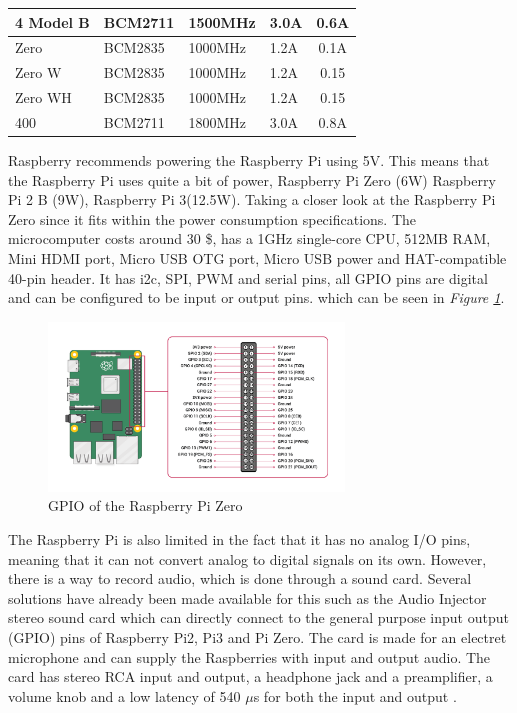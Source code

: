 \begin{center}
\begin{table}[h]
\begin{tabular}{|l|l|l|l|c|}
     4 Model B  & BCM2711      & 1500MHz        & 3.0A          & 0.6A                  \\ \hline
     Zero       & BCM2835      & 1000MHz        & 1.2A          & 0.1A                   \\ \hline
     Zero W     & BCM2835      & 1000MHz        & 1.2A          & 0.15                  \\ \hline
     Zero WH    & BCM2835      & 1000MHz        & 1.2A          & 0.15                  \\ \hline
     400        & BCM2711      & 1800MHz        & 3.0A          & 0.8A                  \\ \hline
    \end{tabular}
\end{table}
\end{center}

Raspberry recommends powering the Raspberry Pi using 5V.
This means that the Raspberry Pi uses quite a bit of power, Raspberry Pi Zero (6W) Raspberry Pi 2 B (9W), Raspberry Pi 3(12.5W).
Taking a closer look at the Raspberry Pi Zero since it fits within the power consumption specifications.
The microcomputer costs around 30 \$, has a 1GHz single-core CPU, 512MB RAM, Mini HDMI port, Micro USB OTG port,
Micro USB power and HAT-compatible 40-pin header.
It has i2c, SPI, PWM and serial pins, all GPIO pins are digital and can be configured to be input or output pins.
which can be seen in \textit{Figure \ref{fig:RPIGPIO}}.

\begin{figure}[h]
    \centering
    \includegraphics[width=0.70\textwidth]{graphics/ZeroGPIO.png}
    \caption{GPIO of the Raspberry Pi Zero \cite{noauthor_gpio_nodate}}
    \label{fig:RPIGPIO}
\end{figure}

The Raspberry Pi is also limited in the fact that it has no analog I/O pins, meaning that it can not convert analog to digital signals on its own.
However, there is a way to record audio, which is done through a sound card.
Several solutions have already been made available for this such as the Audio Injector stereo sound card which can directly connect to the general purpose input output (GPIO) pins of Raspberry Pi2, Pi3 and Pi Zero.
The card is made for an electret microphone and can supply the Raspberries with input and output audio.
The card has stereo RCA input and output, a headphone jack and a preamplifier, a volume knob and a low latency of 540 $\mu$s for both the input and output \cite{noauthor_rpi_nodate}.

